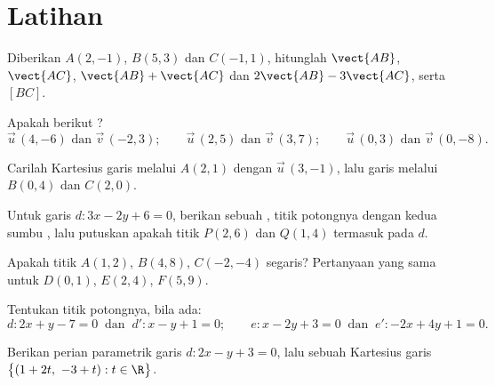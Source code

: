 \section{Latihan}

\begin{exercise}[$\star$]\label{exo:g11:vect:1}
Diberikan $A(2, -1)$, $B(5, 3)$ dan $C(-1, 1)$, hitunglah 
$\vect{AB}$, $\vect{AC}$, $\vect{AB} + \vect{AC}$ dan $2\vect{AB} -
3\vect{AC}$, serta  $[BC]$.
\end{exercise}

\begin{exercise}[$\star$]\label{exo:g11:vect:2}
Apakah  berikut ?
\[
\vec u\,(4, -6) \text{ dan } \vec v\,(-2, 3); \qquad
\vec u\,(2, 5) \text{ dan } \vec v\,(3, 7); \qquad
\vec u\,(0, 3) \text{ dan } \vec v\,(0, -8).
\]
\end{exercise}

\begin{exercise}[$\star$]\label{exo:g11:vect:3}
Carilah  Kartesius garis melalui $A(2, 1)$ dengan  $\vec u\,(3, -1)$, lalu garis melalui $B(0, 4)$ dan
$C(2, 0)$.
\end{exercise}

\begin{exercise}[$\star$]\label{exo:g11:vect:4}
Untuk garis $d: 3x - 2y + 6 = 0$, berikan sebuah ,
titik potongnya dengan kedua sumbu , lalu putuskan apakah titik
$P(2, 6)$ dan $Q(1, 4)$ termasuk pada $d$.
\end{exercise}

\begin{exercise}[$\star\star$]\label{exo:g11:vect:5}
Apakah titik $A(1, 2)$, $B(4, 8)$, $C(-2, -4)$ segaris? Pertanyaan yang sama
untuk $D(0, 1)$, $E(2, 4)$, $F(5, 9)$.
\end{exercise}

\begin{exercise}[$\star\star$]\label{exo:g11:vect:6}
Tentukan titik potongnya, bila ada:
\[
d: 2x + y - 7 = 0 \ \text{ dan }\ d': x - y + 1 = 0;
\qquad
e: x - 2y + 3 = 0 \ \text{ dan }\ e': -2x + 4y + 1 = 0 .
\]
\end{exercise}

\begin{exercise}[$\star\star$]\label{exo:g11:vect:7}
Berikan perian parametrik garis $d: 2x - y + 3 = 0$, lalu sebuah
 Kartesius garis
$\bigl\{(1 + 2t,\ -3 + t) : t \in \R\bigr\}$.
\end{exercise}

